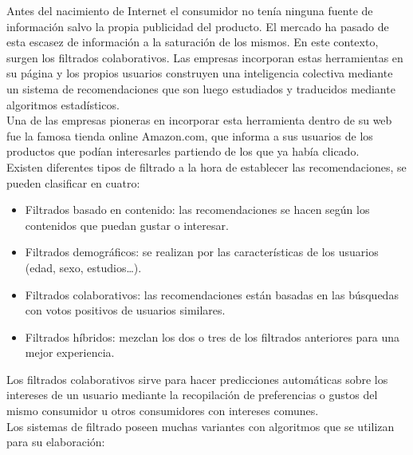 \documentclass[preprint,12pt]{elsarticle}
\begin{document}
\begin{enumerate}[3.1]
Antes del nacimiento de Internet el consumidor no tenía ninguna fuente de información salvo la propia publicidad del producto. El mercado ha pasado de esta escasez de información a la saturación de los mismos. En este contexto, surgen los filtrados colaborativos. Las empresas incorporan estas herramientas en su página y los propios usuarios construyen una inteligencia colectiva mediante un sistema de recomendaciones que son luego estudiados y traducidos mediante algoritmos estadísticos.\\

Una de las empresas pioneras en incorporar esta herramienta dentro de su web fue la famosa tienda online Amazon.com, que informa a sus usuarios de los productos que podían interesarles partiendo de los que ya había clicado.\\

Existen diferentes tipos de filtrado a la hora de establecer las recomendaciones, se pueden clasificar en cuatro:

   	\begin{itemize}
	\item Filtrados basado en contenido: las recomendaciones se hacen según los contenidos que puedan gustar o interesar.
	\item Filtrados demográficos: se realizan por las características de los usuarios (edad, sexo, estudios…).
	\item Filtrados colaborativos: las recomendaciones están basadas en las búsquedas con votos positivos de usuarios similares.
	\item Filtrados híbridos: mezclan los dos o tres de los filtrados anteriores para una mejor experiencia.
	\end{itemize}

Los filtrados colaborativos sirve para hacer predicciones automáticas sobre los intereses de un usuario mediante la recopilación de preferencias o gustos del mismo consumidor u otros consumidores con intereses comunes.\\

Los sistemas de filtrado poseen muchas variantes con algoritmos que se utilizan para su elaboración: \\


\end{enumerate}
\end{document}
